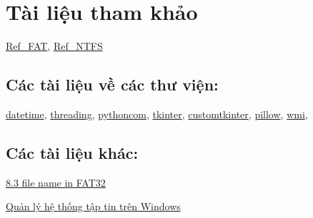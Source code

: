 \section{Tài liệu tham khảo}

\href{https://drive.google.com/file/d/1T8vThhmtEnyc9rVS1hBLad1QCPU-PPzD/view?usp=drive_link}{Ref\_FAT}, \href{https://drive.google.com/file/d/1TSQMgrgGzsaY6w6EpwxJh-LI0YTezMSZ/view?usp=sharing}{Ref\_NTFS}


\subsection{Các tài liệu về các thư viện: }
\href{https://docs.python.org/3/library/datetime.html}{datetime},	
\href{https://docs.python.org/3/library/threading.html}{threading},
\href{https://timgolden.me.uk/pywin32-docs/html/com/win32com/HTML/docindex.html}{pythoncom},
\href{https://docs.python.org/3/library/tkinter.html}{tkinter},
\href{https://customtkinter.tomschimansky.com/}{customtkinter}, 
\href{https://pypi.org/project/pillow/}{pillow},
\href{https://timgolden.me.uk/python/wmi/tutorial.html}{wmi},

\subsection{Các tài liệu khác:}
\href{https://en.wikipedia.org/wiki/8.3_filename?}{8.3 file name in FAT32}

\href{https://www.studocu.vn/vn/document/university-of-science-vnuhcm/he-dieu-hanh/bao-cao-ve-lab-01/76055110}{Quản lý hệ thống tập tin trên Windows}